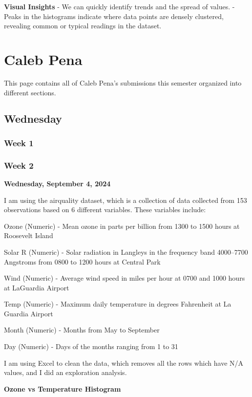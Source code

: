 \documentclass[
  letterpaper,
  DIV=11,
  numbers=noendperiod]{scrreprt}
\begin{document}
\textbf{Visual Insights} - We can quickly identify trends and the spread
of values. - Peaks in the histograms indicate where data points are
densely clustered, revealing common or typical readings in the dataset.

\chapter{Caleb Pena}\label{caleb-pena}

This page contains all of Caleb Pena's submissions this semester
organized into different sections.

\section{Wednesday}\label{wednesday-1}

\subsection{Week 1}\label{week-1-2}

\subsection{Week 2}\label{week-2-2}

\textbf{Wednesday, September 4, 2024}

I am using the airquality dataset, which is a collection of data
collected from 153 observations based on 6 different variables. These
variables include:

Ozone (Numeric) - Mean ozone in parts per billion from 1300 to 1500
hours at Roosevelt Island

Solar R (Numeric) - Solar radiation in Langleys in the frequency band
4000--7700 Angstroms from 0800 to 1200 hours at Central Park

Wind (Numeric) - Average wind speed in miles per hour at 0700 and 1000
hours at LaGuardia Airport

Temp (Numeric) - Maximum daily temperature in degrees Fahrenheit at La
Guardia Airport

Month (Numeric) - Months from May to September

Day (Numeric) - Days of the months ranging from 1 to 31

I am using Excel to clean the data, which removes all the rows which
have N/A values, and I did an exploration analysis.

\textbf{Ozone vs Temperature Histogram}
\end{document}
